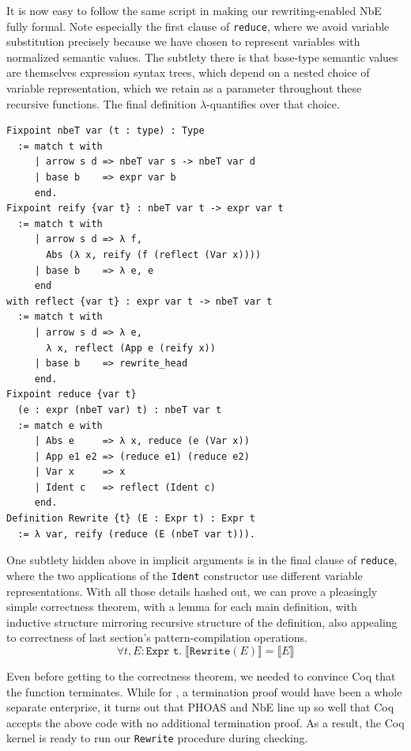 It is now easy to follow the same script in making our rewriting-enabled NbE fully formal.
Note especially the first clause of \texttt{reduce}, where we avoid variable substitution precisely because we have chosen to represent variables with normalized semantic values.
The subtlety there is that base-type semantic values are themselves expression syntax trees, which depend on a nested choice of variable representation, which we retain as a parameter throughout these recursive functions.
The final definition $\lambda$-quantifies over that choice.
\begin{verbatim}
Fixpoint nbeT var (t : type) : Type
  := match t with
     | arrow s d => nbeT var s -> nbeT var d
     | base b    => expr var b
     end.
Fixpoint reify {var t} : nbeT var t -> expr var t
  := match t with
     | arrow s d => λ f,
       Abs (λ x, reify (f (reflect (Var x))))
     | base b    => λ e, e
     end
with reflect {var t} : expr var t -> nbeT var t
  := match t with
     | arrow s d => λ e,
       λ x, reflect (App e (reify x))
     | base b    => rewrite_head
     end.
Fixpoint reduce {var t}
  (e : expr (nbeT var) t) : nbeT var t
  := match e with
     | Abs e     => λ x, reduce (e (Var x))
     | App e1 e2 => (reduce e1) (reduce e2)
     | Var x     => x
     | Ident c   => reflect (Ident c)
     end.
Definition Rewrite {t} (E : Expr t) : Expr t
  := λ var, reify (reduce (E (nbeT var t))).
\end{verbatim}

One subtlety hidden above in implicit arguments is in the final clause of \texttt{reduce}, where the two applications of the \texttt{Ident} constructor use different variable representations.
With all those details hashed out, we can prove a pleasingly simple correctness theorem, with a lemma for each main definition, with inductive structure mirroring recursive structure of the definition, also appealing to correctness of last section's pattern-compilation operations.
$$\forall t, E : \texttt{Expr t}. \; \llbracket \texttt{Rewrite}(E) \rrbracket = \llbracket E \rrbracket$$

Even before getting to the correctness theorem, we needed to convince Coq that the function terminates.
While for \textcite{Aehlig}, a termination proof would have been a whole separate enterprise, it turns out that PHOAS and NbE line up so well that Coq accepts the above code with no additional termination proof.
As a result, the Coq kernel is ready to run our \texttt{Rewrite} procedure during checking.

